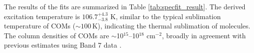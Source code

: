\documentclass[twocolumn, twocolappendix, astrosymb, times]{aastex631}
\newcommand{\methanol}{CH$_3$OH\xspace}
\newcommand{\acetaldehyde}{CH$_3$CHO\xspace}
\newcommand{\acetone}{CH$_3$COCH$_3$\xspace}
\newcommand{\ethyleneoxide}{$c$-C$_2$H$_4$O\xspace}
\begin{document}
The results of the fits are summarized in Table \ref{tab:specfit_result}. The derived excitation temperature is $106.7_{-3.8}^{+4.3}$ K, similar to the typical sublimation temperature of COMs ($\sim100$\,K), indicating the thermal sublimation of molecules. The column densities of COMs are $\sim$10$^{15}$--10$^{18}$ cm$^{-2}$, broadly in agreement with previous estimates using Band 7 data \citep{Lee2019}. 

\begin{figure*}
\caption{Demonstration of the simultaneous spectral fit for a selected frequency range in SPW 7. The observed spectra (gray) is well reproduced by the model (black) composed of multiple blended transitions of different species, \methanol, \acetaldehyde, \acetone, \ethyleneoxide, and CH$_3^{13}$CHO (dashed colored lines).}
\label{fig:spectral_fit_demo}
\end{figure*}
\end{document}
